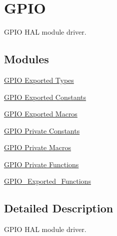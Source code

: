 \hypertarget{group___g_p_i_o}{}\section{G\+P\+IO}
\label{group___g_p_i_o}


G\+P\+IO H\+AL module driver.  


\subsection*{Modules}
\begin{DoxyCompactItemize}
\item 
\hyperlink{group___g_p_i_o___exported___types}{G\+P\+I\+O Exported Types}
\item 
\hyperlink{group___g_p_i_o___exported___constants}{G\+P\+I\+O Exported Constants}
\item 
\hyperlink{group___g_p_i_o___exported___macros}{G\+P\+I\+O Exported Macros}
\item 
\hyperlink{group___g_p_i_o___private___constants}{G\+P\+I\+O Private Constants}
\item 
\hyperlink{group___g_p_i_o___private___macros}{G\+P\+I\+O Private Macros}
\item 
\hyperlink{group___g_p_i_o___private___functions}{G\+P\+I\+O Private Functions}
\item 
\hyperlink{group___g_p_i_o___exported___functions}{G\+P\+I\+O\+\_\+\+Exported\+\_\+\+Functions}
\end{DoxyCompactItemize}


\subsection{Detailed Description}
G\+P\+IO H\+AL module driver. 

